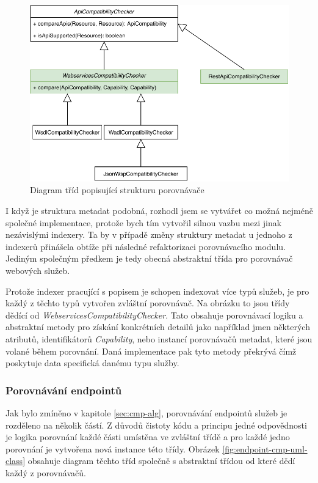 \documentclass[czech,DP]{thesiskiv}
\begin{document}
\begin{figure}[h]
	\centering
		\includegraphics[width=\linewidth]{cmp-uml-class}
	\caption{Diagram tříd popisující strukturu porovnávače}
	\label{fig:cmp-uml-class}
\end{figure}

I když je struktura metadat podobná, rozhodl jsem se vytvářet co možná nejméně společné implementace, protože bych tím vytvořil silnou vazbu mezi jinak nezávislými indexery. Ta by v případě změny struktury metadat u jednoho z indexerů přinášela obtíže při následné refaktorizaci porovnávacího modulu. Jediným společným předkem je tedy obecná abstraktní třída pro porovnávač webových služeb.

Protože indexer pracující s popisem je schopen indexovat více typů služeb, je pro každý z těchto typů vytvořen zvláštní porovnávač. Na obrázku to jsou třídy dědící od \textit{WebservicesCompatibilityChecker}. Tato obsahuje porovnávací logiku a abstraktní metody pro získání konkrétních detailů jako například jmen některých atributů, identifikátorů \textit{Capability}, nebo instancí porovnávačů metadat, které jsou volané během porovnání. Daná implementace pak tyto metody překrývá čímž poskytuje data specifická danému typu služby.

\subsubsection{Porovnávání endpointů}

Jak bylo zmíněno v kapitole \ref{sec:cmp-alg}, porovnávání endpointů služeb je rozděleno na několik částí. Z důvodů čistoty kódu a principu jedné odpovědnosti je logika porovnání každé části umístěna ve zvláštní třídě a pro každé jedno porovnání je vytvořena nová instance této třídy. Obrázek \ref{fig:endpoint-cmp-uml-class} obsahuje diagram těchto tříd společně s abstraktní třídou od které dědí každý z porovnávačů. 
\end{document}
